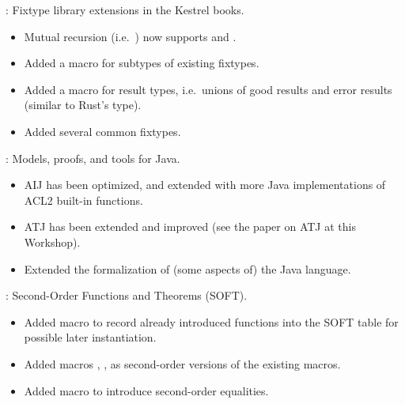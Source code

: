 
\begin{frame}

\implibtitle

:
Fixtype library extensions in the Kestrel books.
\begin{itemize}
\item Mutual recursion (i.e.\ )
      now supports  and .
\item Added a macro  for subtypes of existing fixtypes.
\item Added a macro  for result types,
      i.e.\ unions of good results and error results
      (similar to Rust's  type).
\item Added several common fixtypes.
\end{itemize}

\end{frame}


\begin{frame}

\implibtitle

:
Models, proofs, and tools for Java.
\begin{itemize}
\item AIJ has been optimized,
      and extended with more Java implementations of ACL2 built-in functions.
\item ATJ has been extended and improved
      (see the paper on ATJ at this Workshop).
\item Extended the formalization of (some aspects of) the Java language.
\end{itemize}

\end{frame}


\begin{frame}

\implibtitle

:
Second-Order Functions and Theorems (SOFT).
\begin{itemize}
\item Added macro  to record already introduced functions
      into the SOFT table for possible later instantiation.
\item Added macros , , 
      as second-order versions of the existing macros.
\item Added macro  to introduce second-order equalities.
\end{itemize}

\end{frame}

